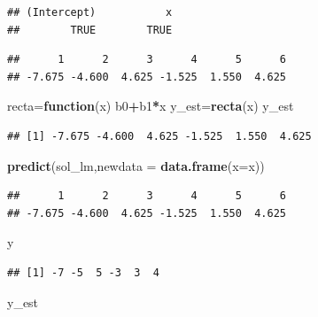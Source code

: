 \documentclass[
]{article}
\newenvironment{Shaded}{\begin{snugshade}}{\end{snugshade}}
\newcommand{\ControlFlowTok}[1]{\textcolor[rgb]{0.13,0.29,0.53}{\textbf{#1}}}
\newcommand{\DataTypeTok}[1]{\textcolor[rgb]{0.13,0.29,0.53}{#1}}
\newcommand{\KeywordTok}[1]{\textcolor[rgb]{0.13,0.29,0.53}{\textbf{#1}}}
\newcommand{\NormalTok}[1]{#1}
\newcommand{\OperatorTok}[1]{\textcolor[rgb]{0.81,0.36,0.00}{\textbf{#1}}}
\begin{document}
\begin{verbatim}
## (Intercept)           x 
##        TRUE        TRUE
\end{verbatim}

\begin{Shaded}
\end{Shaded}

\begin{verbatim}
##      1      2      3      4      5      6 
## -7.675 -4.600  4.625 -1.525  1.550  4.625
\end{verbatim}

\begin{Shaded}
\begin{Highlighting}[]
\NormalTok{recta=}\ControlFlowTok{function}\NormalTok{(x) b0}\OperatorTok{+}\NormalTok{b1}\OperatorTok{*}\NormalTok{x}
\NormalTok{y_est=}\KeywordTok{recta}\NormalTok{(x)}
\NormalTok{y_est}
\end{Highlighting}
\end{Shaded}

\begin{verbatim}
## [1] -7.675 -4.600  4.625 -1.525  1.550  4.625
\end{verbatim}

\begin{Shaded}
\begin{Highlighting}[]
\KeywordTok{predict}\NormalTok{(sol_lm,}\DataTypeTok{newdata =} \KeywordTok{data.frame}\NormalTok{(}\DataTypeTok{x=}\NormalTok{x))}
\end{Highlighting}
\end{Shaded}

\begin{verbatim}
##      1      2      3      4      5      6 
## -7.675 -4.600  4.625 -1.525  1.550  4.625
\end{verbatim}

\begin{Shaded}
\begin{Highlighting}[]
\NormalTok{y}
\end{Highlighting}
\end{Shaded}

\begin{verbatim}
## [1] -7 -5  5 -3  3  4
\end{verbatim}

\begin{Shaded}
\begin{Highlighting}[]
\NormalTok{y_est}
\end{Highlighting}
\end{Shaded}
\end{document}
